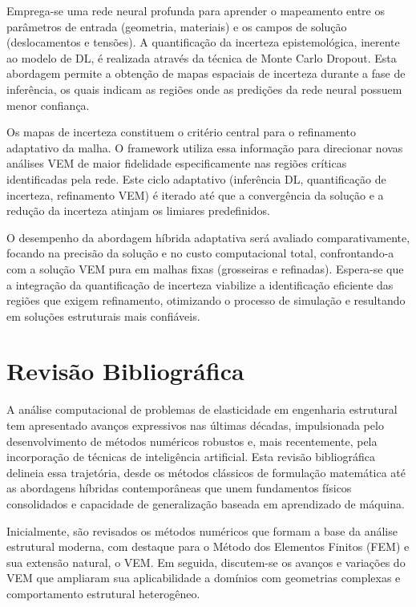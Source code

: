 \documentclass[12pt,openright,oneside,a4paper,english,brazil]{abntex2}
\begin{document}
Emprega-se uma rede neural profunda para aprender o mapeamento entre os parâmetros de entrada (geometria, materiais) e os campos de solução (deslocamentos e tensões). A quantificação da incerteza epistemológica, inerente ao modelo de DL, é realizada através da técnica de Monte Carlo Dropout. Esta abordagem permite a obtenção de mapas espaciais de incerteza durante a fase de inferência, os quais 
indicam as regiões onde as predições da rede neural possuem menor confiança.

Os mapas de incerteza constituem o critério central para o refinamento adaptativo da malha. O framework utiliza essa informação para direcionar novas análises VEM de maior fidelidade especificamente nas regiões críticas identificadas pela rede. Este ciclo adaptativo (inferência DL, quantificação de incerteza, refinamento VEM) é iterado até que a convergência da solução e a redução da incerteza 
atinjam os limiares predefinidos.

O desempenho da abordagem híbrida adaptativa será avaliado comparativamente, focando na precisão da solução e no custo computacional total, confrontando-a com a solução VEM pura em malhas fixas (grosseiras e refinadas). Espera-se que a integração da quantificação de incerteza viabilize a identificação eficiente das regiões que exigem refinamento, otimizando o processo de simulação e resultando 
em soluções estruturais mais confiáveis.

\chapter{Revisão Bibliográfica}

A análise computacional de problemas de elasticidade em engenharia estrutural tem apresentado avanços expressivos nas últimas décadas, impulsionada pelo desenvolvimento de métodos numéricos robustos e, mais recentemente, pela incorporação de técnicas de inteligência artificial. Esta revisão bibliográfica delineia essa trajetória, desde os métodos clássicos de formulação matemática até as 
abordagens híbridas contemporâneas que unem fundamentos físicos consolidados e capacidade de generalização baseada em aprendizado de máquina.

Inicialmente, são revisados os métodos numéricos que formam a base da análise estrutural moderna, com destaque para o Método dos Elementos Finitos (FEM) e sua extensão natural, o VEM. Em seguida, discutem-se os avanços e variações do VEM que ampliaram sua aplicabilidade a domínios com geometrias complexas e comportamento estrutural heterogêneo.
\end{document}
